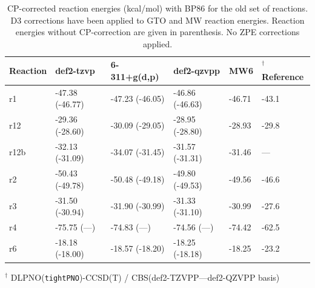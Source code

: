 \documentclass[11pt,a4paper]{article}
\begin{document}
	\begin{table}[H]
		\centering
		\label{tab: rxn energies old bp86}
		\caption{CP-corrected reaction energies (\si{kcal/mol}) with BP86 for the old set of reactions. D3 corrections have been applied to GTO and MW reaction energies. Reaction energies without CP-correction are given in parenthesis. No ZPE corrections applied.}
		\begin{threeparttable}
		\begin{tabular}{l l l l l l }
			\toprule
			Reaction & def2-tzvp       & 6-311+g(d,p)    & def2-qzvpp      & MW6    & $^\dagger$Reference \parencite{dohm2018} \\ \midrule
			r1       & -47.38 (-46.77) & -47.23 (-46.05) & -46.86 (-46.63) & -46.71 & -43.1                          \\
			r12      & -29.36 (-28.60) & -30.09 (-29.05) & -28.95 (-28.80) & -28.93 & -29.8                          \\
			r12b     & -32.13 (-31.09) & -34.07 (-31.45) & -31.57 (-31.31) & -31.46 & ---                               \\
			r2       & -50.43 (-49.78) & -50.48 (-49.18) & -49.80 (-49.53) & -49.56 & -46.6                          \\
			r3       & -31.50 (-30.94) & -31.90 (-30.99) & -31.33 (-31.10) & -30.99 & -27.6                          \\
			r4       & -75.75 (---)    & -74.83 (---)    & -74.56 (---)    & -74.42 & -62.5                      					    \\
			r6       & -18.18 (-18.00) & -18.57 (-18.20) & -18.25 (-18.18) & -18.25 & -23.2                          \\ \bottomrule
		\end{tabular}
\begin{tablenotes}
	\item $^\dagger$ DLPNO(\verb|tightPNO|)-CCSD(T) / CBS(def2-TZVPP---def2-QZVPP basis)
\end{tablenotes}

\end{threeparttable}
	\end{table}
\end{document}
